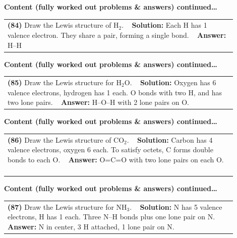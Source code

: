 \documentclass{article}
\begin{document}
{\newpage
\noindent
{\large\textbf{Content (fully worked out problems & answers) continued…}}\\[0.2em]
\begin{tabular}{|p{0.9\linewidth}|}
\hline
\vspace{0.2cm}
\textbf{(84)} Draw the Lewis structure of H$_2$. \
\hline
\vspace{0.2cm}
\textbf{Solution:} Each H has 1 valence electron. They share a pair, forming a single bond. \
\hline
\vspace{0.2cm}
\textbf{Answer:} H–H \
\hline
\end{tabular}

\newpage
\noindent
{\large\textbf{Content (fully worked out problems & answers) continued…}}\\[0.2em]
\begin{tabular}{|p{0.9\linewidth}|}
\hline
\vspace{0.2cm}
\textbf{(85)} Draw the Lewis structure for H$_2$O. \
\hline
\vspace{0.2cm}
\textbf{Solution:} Oxygen has 6 valence electrons, hydrogen has 1 each. O bonds with two H, and has two lone pairs. \
\hline
\vspace{0.2cm}
\textbf{Answer:} H–O–H with 2 lone pairs on O. \
\hline
\end{tabular}

\newpage
\noindent
{\large\textbf{Content (fully worked out problems & answers) continued…}}\\[0.2em]
\begin{tabular}{|p{0.9\linewidth}|}
\hline
\vspace{0.2cm}
\textbf{(86)} Draw the Lewis structure of CO$_2$. \
\hline
\vspace{0.2cm}
\textbf{Solution:} Carbon has 4 valence electrons, oxygen 6 each. To satisfy octets, C forms double bonds to each O. \
\hline
\vspace{0.2cm}
\textbf{Answer:} O=C=O with two lone pairs on each O. \
\hline
\end{tabular}

\newpage
\noindent
{\large\textbf{Content (fully worked out problems & answers) continued…}}\\[0.2em]
\begin{tabular}{|p{0.9\linewidth}|}
\hline
\vspace{0.2cm}
\textbf{(87)} Draw the Lewis structure for NH$_3$. \
\hline
\vspace{0.2cm}
\textbf{Solution:} N has 5 valence electrons, H has 1 each. Three N–H bonds plus one lone pair on N. \
\hline
\vspace{0.2cm}
\textbf{Answer:} N in center, 3 H attached, 1 lone pair on N. \
\hline
\end{tabular}

}
\end{document}
